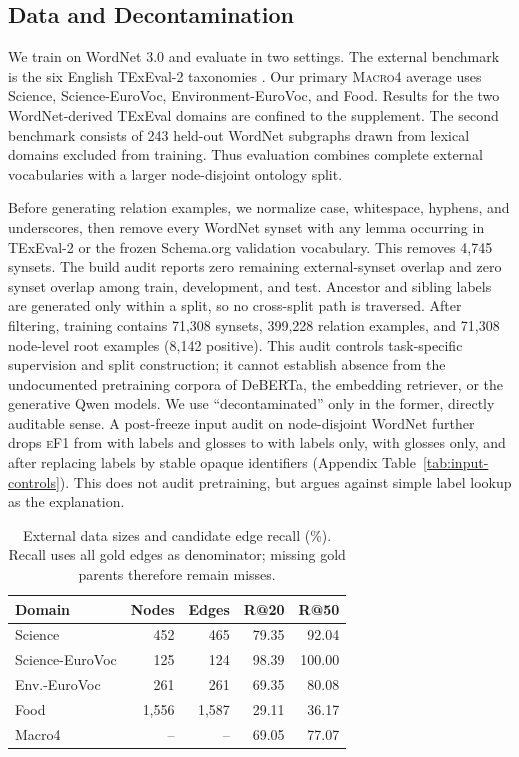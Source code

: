 \documentclass[11pt]{article}
\newcommand{\ef}{\textsc{eF1}}
\begin{document}
\subsection{Data and Decontamination}

We train on WordNet 3.0 \citep{miller1995wordnet} and evaluate in two settings.
The external benchmark is the six English TExEval-2 taxonomies
\citep{bordea-etal-2016-semeval}.  Our primary \textsc{Macro4} average uses
Science, Science-EuroVoc, Environment-EuroVoc, and Food. Results for the two
WordNet-derived TExEval domains are confined to the supplement. The second
benchmark consists of 243 held-out WordNet subgraphs
drawn from lexical domains excluded from training. Thus evaluation combines
complete external vocabularies with a larger node-disjoint ontology split.

Before generating relation examples, we normalize case, whitespace, hyphens,
and underscores, then remove every WordNet synset with any lemma occurring in
TExEval-2 or the frozen Schema.org validation vocabulary.  This removes 4,745
synsets.  The build audit reports zero remaining external-synset overlap and
zero synset overlap among train, development, and test.  Ancestor and sibling
labels are generated only within a split, so no cross-split path is traversed.
After filtering, training contains 71,308 synsets, 399,228 relation examples,
and 71,308 node-level root examples (8,142 positive).
This audit controls task-specific supervision and split construction; it cannot
establish absence from the undocumented pretraining corpora of DeBERTa, the
embedding retriever, or the generative Qwen models. We use ``decontaminated''
only in the former, directly auditable sense.
A post-freeze input audit on node-disjoint WordNet further drops \ef{} from
\InputFull{} with labels and glosses to \InputLabels{} with labels only,
\InputDefinitions{} with glosses only, and \InputAnonymous{} after replacing
labels by stable opaque identifiers (Appendix Table~\ref{tab:input-controls}). This does
not audit pretraining, but argues against simple label lookup as the explanation.

\begin{table}[t]
\centering
\small
\setlength{\tabcolsep}{3.5pt}
\begin{tabular}{lrrrr}
\toprule
Domain & Nodes & Edges & R@20 & R@50\\
\midrule
Science & 452 & 465 & 79.35 & 92.04\\
Science-EuroVoc & 125 & 124 & 98.39 & 100.00\\
Env.-EuroVoc & 261 & 261 & 69.35 & 80.08\\
Food & 1,556 & 1,587 & 29.11 & 36.17\\
\midrule
Macro4 & -- & -- & 69.05 & 77.07\\
\bottomrule
\end{tabular}
\caption{External data sizes and candidate edge recall (\%). Recall uses all
gold edges as denominator; missing gold parents therefore remain misses.}
\label{tab:retrieval}
\end{table}
\end{document}
